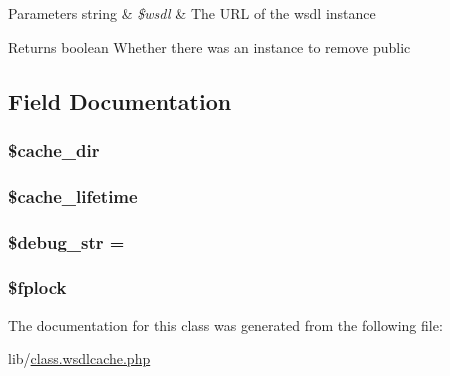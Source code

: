 \begin{DoxyParams}[1]{Parameters}
string & {\em \$wsdl} & The U\+R\+L of the wsdl instance \\
\hline
\end{DoxyParams}
\begin{DoxyReturn}{Returns}
boolean Whether there was an instance to remove  public 
\end{DoxyReturn}


\subsection{Field Documentation}
\hypertarget{classnusoap__wsdlcache_a22a35efc9ca709527d49ff8bfe76db78}{}
\subsubsection[{\$cache\+\_\+dir}]{\setlength{\rightskip}{0pt plus 5cm}\$cache\+\_\+dir}\label{classnusoap__wsdlcache_a22a35efc9ca709527d49ff8bfe76db78}
\hypertarget{classnusoap__wsdlcache_a5aaab753f75170fa670cbb602aa97119}{}
\subsubsection[{\$cache\+\_\+lifetime}]{\setlength{\rightskip}{0pt plus 5cm}\$cache\+\_\+lifetime}\label{classnusoap__wsdlcache_a5aaab753f75170fa670cbb602aa97119}
\hypertarget{classnusoap__wsdlcache_ad04cbe402f400eb4b0b40f2c03985452}{}
\subsubsection[{\$debug\+\_\+str}]{\setlength{\rightskip}{0pt plus 5cm}\$debug\+\_\+str = \textquotesingle{}\textquotesingle{}}\label{classnusoap__wsdlcache_ad04cbe402f400eb4b0b40f2c03985452}
\hypertarget{classnusoap__wsdlcache_ae9b06e44c182e3d33c7393dd8f925c15}{}
\subsubsection[{\$fplock}]{\setlength{\rightskip}{0pt plus 5cm}\$fplock}\label{classnusoap__wsdlcache_ae9b06e44c182e3d33c7393dd8f925c15}


The documentation for this class was generated from the following file\+:\begin{DoxyCompactItemize}
\item 
lib/\hyperlink{class_8wsdlcache_8php}{class.\+wsdlcache.\+php}\end{DoxyCompactItemize}
